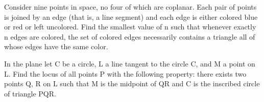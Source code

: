 \item Consider nine points in space, no four of which are coplanar. Each pair of points is joined by an edge (that is, a line segment) and each edge is either colored blue or red or left uncolored. Find the smallest value of n such that whenever exactly n edges are colored, the set of colored edges necessarily contains a triangle all of whose edges have the same color.\\ 

\item In the plane let C be a circle, L a line tangent to the circle C, and M a point on L. Find the locus of all points P with the following property: there exists two points Q, R on L such that M is the midpoint of QR and C is the inscribed circle of triangle PQR.

